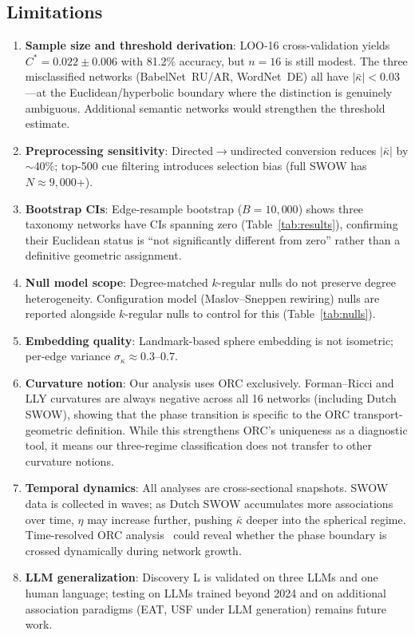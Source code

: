 \documentclass[11pt,a4paper]{article}
\newcommand{\kbar}{\bar{\kappa}}
\newcommand{\Cstar}{C^*}
\begin{document}
\subsection{Limitations}

\begin{enumerate}
    \item \textbf{Sample size and threshold derivation}: LOO-16 cross-validation yields $\Cstar = 0.022 \pm 0.006$ with 81.2\% accuracy, but $n=16$ is still modest. The three misclassified networks (BabelNet~RU/AR, WordNet~DE) all have $|\kbar| < 0.03$---at the Euclidean/hyperbolic boundary where the distinction is genuinely ambiguous. Additional semantic networks would strengthen the threshold estimate.
    \item \textbf{Preprocessing sensitivity}: Directed$\to$undirected conversion reduces $|\kbar|$ by $\sim$40\%; top-500 cue filtering introduces selection bias (full SWOW has $N \approx 9{,}000$+).
    \item \textbf{Bootstrap CIs}: Edge-resample bootstrap ($B=10{,}000$) shows three taxonomy networks have CIs spanning zero (Table~\ref{tab:results}), confirming their Euclidean status is ``not significantly different from zero'' rather than a definitive geometric assignment.
    \item \textbf{Null model scope}: Degree-matched $k$-regular nulls do not preserve degree heterogeneity. Configuration model (Maslov--Sneppen rewiring) nulls are reported alongside $k$-regular nulls to control for this (Table~\ref{tab:nulls}).
    \item \textbf{Embedding quality}: Landmark-based sphere embedding is not isometric; per-edge variance $\sigma_\kappa \approx 0.3$--$0.7$.
    \item \textbf{Curvature notion}: Our analysis uses ORC exclusively. Forman--Ricci and LLY curvatures are always negative across all 16 networks (including Dutch SWOW), showing that the phase transition is specific to the ORC transport-geometric definition. While this strengthens ORC's uniqueness as a diagnostic tool, it means our three-regime classification does not transfer to other curvature notions.
    \item \textbf{Temporal dynamics}: All analyses are cross-sectional snapshots. SWOW data is collected in waves; as Dutch SWOW accumulates more associations over time, $\eta$ may increase further, pushing $\kbar$ deeper into the spherical regime. Time-resolved ORC analysis~\cite{ni2019community} could reveal whether the phase boundary is crossed dynamically during network growth.
    \item \textbf{LLM generalization}: Discovery L is validated on three LLMs and one human language; testing on LLMs trained beyond 2024 and on additional association paradigms (EAT, USF under LLM generation) remains future work.
\end{enumerate}
\end{document}
